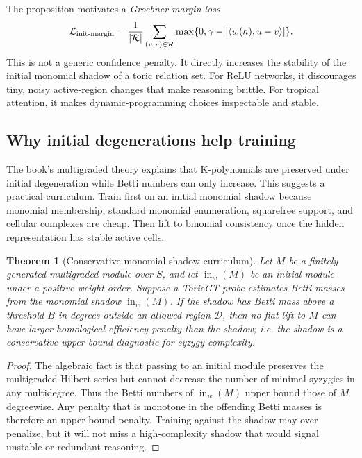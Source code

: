 \documentclass[11pt]{article}
\newtheorem{theorem}{Theorem}[section]
\theoremstyle{definition}
\newcommand{\inw}{\operatorname{in}_{w}}
\begin{document}
The proposition motivates a \emph{Groebner-margin loss}
\[
\mathcal{L}_{\rm init\text{-}margin}=\frac{1}{|\mathcal{R}|}\sum_{(u,v)\in\mathcal{R}}\max\{0,\gamma-|\langle w(h),u-v\rangle|\}.
\]
This is not a generic confidence penalty.  It directly increases the stability of the initial monomial shadow of a toric relation set.  For ReLU networks, it discourages tiny, noisy active-region changes that make reasoning brittle.  For tropical attention, it makes dynamic-programming choices inspectable and stable.

\subsection{Why initial degenerations help training}
The book's multigraded theory explains that K-polynomials are preserved under initial degeneration while Betti numbers can only increase.  This suggests a practical curriculum.  Train first on an initial monomial shadow because monomial membership, standard monomial enumeration, squarefree support, and cellular complexes are cheap.  Then lift to binomial consistency once the hidden representation has stable active cells.

\begin{theorem}[Conservative monomial-shadow curriculum]
Let \(M\) be a finitely generated multigraded module over \(S\), and let \(\inw(M)\) be an initial module under a positive weight order.  Suppose a ToricGT probe estimates Betti masses from the monomial shadow \(\inw(M)\).  If the shadow has Betti mass above a threshold \(B\) in degrees outside an allowed region \(\mathcal{D}\), then no flat lift to \(M\) can have larger homological efficiency penalty than the shadow; i.e. the shadow is a conservative upper-bound diagnostic for syzygy complexity.
\end{theorem}
\begin{proof}
The algebraic fact is that passing to an initial module preserves the multigraded Hilbert series but cannot decrease the number of minimal syzygies in any multidegree.  Thus the Betti numbers of \(\inw(M)\) upper bound those of \(M\) degreewise.  Any penalty that is monotone in the offending Betti masses is therefore an upper-bound penalty.  Training against the shadow may over-penalize, but it will not miss a high-complexity shadow that would signal unstable or redundant reasoning.
\end{proof}
\end{document}
